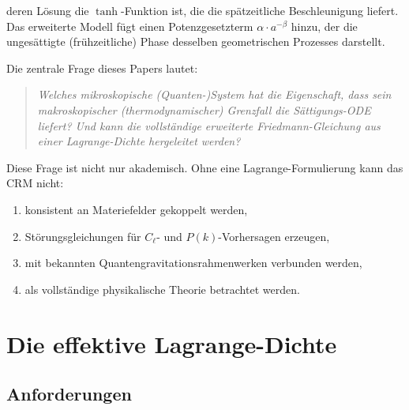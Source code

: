 \documentclass[11pt,a4paper]{article}
\begin{document}
deren L\"osung die $\tanh$-Funktion ist, die die sp\"atzeitliche Beschleunigung liefert. Das erweiterte Modell f\"ugt einen Potenzgesetzterm $\alpha \cdot a^{-\beta}$ hinzu, der die unges\"attigte (fr\"uhzeitliche) Phase desselben geometrischen Prozesses darstellt.

Die zentrale Frage dieses Papers lautet:

\begin{quote}
\textit{Welches mikroskopische (Quanten-)System hat die Eigenschaft, dass sein makroskopischer (thermodynamischer) Grenzfall die S\"attigungs-ODE liefert? Und kann die vollst\"andige erweiterte Friedmann-Gleichung aus einer Lagrange-Dichte hergeleitet werden?}
\end{quote}

Diese Frage ist nicht nur akademisch. Ohne eine Lagrange-Formulierung kann das CRM nicht:
\begin{enumerate}
\item konsistent an Materiefelder gekoppelt werden,
\item St\"orungsgleichungen f\"ur $C_\ell$- und $P(k)$-Vorhersagen erzeugen,
\item mit bekannten Quantengravitationsrahmenwerken verbunden werden,
\item als vollst\"andige physikalische Theorie betrachtet werden.
\end{enumerate}


\section{Die effektive Lagrange-Dichte}
\label{sec:lagrangian}

\subsection{Anforderungen}
\end{document}
